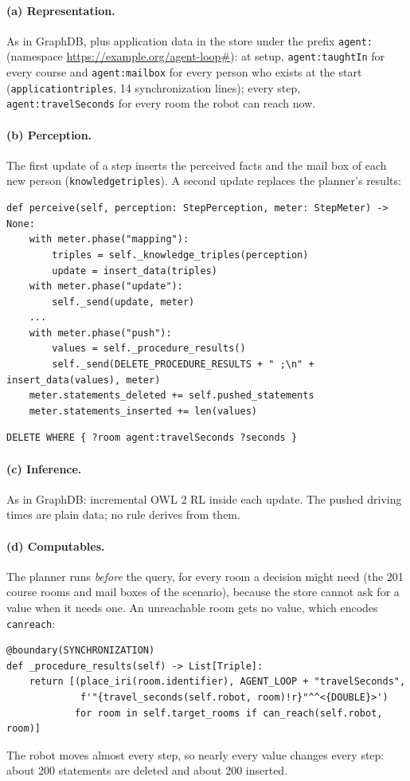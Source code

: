 \documentclass[10pt]{article}
\newcommand{\brkunderscore}{\textunderscore\allowbreak}
\newcommand{\code}[1]{{\let\_\brkunderscore\texttt{#1}}}
\begin{document}
\paragraph{(a) Representation.} As in GraphDB, plus application data in the store under the prefix
\code{agent:} (namespace \url{https://example.org/agent-loop#}): at setup, \code{agent:taughtIn} for every course and \code{agent:mailbox} for
every person who exists at the start (\code{\_application\_triples}, 14 synchronization lines); every step, \code{agent:travelSeconds} for every
room the robot can reach now.

\paragraph{(b) Perception.} The first update of a step inserts the perceived facts and the mail box of each new person
(\code{\_knowledge\_triples}). A second update replaces the planner's results:
\begin{lstlisting}[style=py]
def perceive(self, perception: StepPerception, meter: StepMeter) -> None:
    with meter.phase("mapping"):
        triples = self._knowledge_triples(perception)
        update = insert_data(triples)
    with meter.phase("update"):
        self._send(update, meter)
    ...
    with meter.phase("push"):
        values = self._procedure_results()
        self._send(DELETE_PROCEDURE_RESULTS + " ;\n" + insert_data(values), meter)
    meter.statements_deleted += self.pushed_statements
    meter.statements_inserted += len(values)
\end{lstlisting}
\begin{lstlisting}[style=sq]
DELETE WHERE { ?room agent:travelSeconds ?seconds }
\end{lstlisting}

\paragraph{(c) Inference.} As in GraphDB: incremental OWL 2 RL inside each update. The pushed driving times are plain
data; no rule derives from them.

\paragraph{(d) Computables.} The planner runs \emph{before} the query, for every room a decision might need (the 201
course rooms and mail boxes of the scenario), because the store cannot ask for a value when it needs one. An unreachable
room gets no value, which encodes \code{can\_reach}:
\begin{lstlisting}[style=py]
@boundary(SYNCHRONIZATION)
def _procedure_results(self) -> List[Triple]:
    return [(place_iri(room.identifier), AGENT_LOOP + "travelSeconds",
             f'"{travel_seconds(self.robot, room)!r}"^^<{DOUBLE}>')
            for room in self.target_rooms if can_reach(self.robot, room)]
\end{lstlisting}
The robot moves almost every step, so nearly every value changes every step: about 200 statements are deleted and about
200 inserted.
\end{document}
